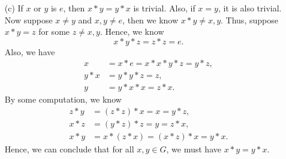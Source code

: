 \begin{enumerate}
\begin{enumerate}
\begin{itemize}
\begin{itemize}
            \end{itemize}
            \item [(c)] If \(x\) or \(y\) is \(e\), then \(x * y = y * x\) is trivial. Also, if \(x = y\), it is also trivial. Now suppose \(x \neq y\) and \(x, y \neq e\), then we know \(x * y \neq x,y\). Thus, suppose \(x * y = z\) for some \(z \neq x,y\). Hence, we know 
            \[
                x * y * z = z * z = e.
            \] Also, we have 
            \begin{align*}
                x &= x * e = x * x * y * z = y * z, \\
                y * x &= y * y * z = z, \\
                y &= y * x * x = z * x .
            \end{align*}
            By some computation, we know 
            \begin{align*}
                z * y &= (z * z) * x = x = y * z, \\
                x * z &= (y * z) * z = y = z * x, \\
                x * y &= x * (z * x) = (x * z) * x = y * x.
            \end{align*}
            Hence, we can conclude that for all \(x, y \in G\), we must have \(x * y = y * x\).  
        \end{itemize} 
    \end{enumerate}

\end{enumerate}